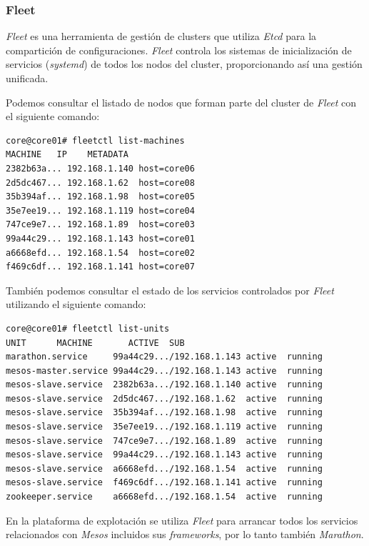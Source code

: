 \documentclass[a4paper,12pt,spanish,final]{epsc_tfc_pfc}
\begin{document}
\subsubsection{Fleet}

\emph{Fleet} es una herramienta de gestión de clusters que utiliza \emph{Etcd} para la compartición de configuraciones. \emph{Fleet} controla los sistemas de inicialización de servicios (\emph{systemd}) de todos los nodos del cluster, proporcionando así una gestión unificada.

Podemos consultar el listado de nodos que forman parte del cluster de \emph{Fleet} con el siguiente comando:\\

\begin{lstlisting}[style=dnsmasq]
core@core01# fleetctl list-machines
MACHINE   IP    METADATA
2382b63a... 192.168.1.140 host=core06
2d5dc467... 192.168.1.62  host=core08
35b394af... 192.168.1.98  host=core05
35e7ee19... 192.168.1.119 host=core04
747ce9e7... 192.168.1.89  host=core03
99a44c29... 192.168.1.143 host=core01
a6668efd... 192.168.1.54  host=core02
f469c6df... 192.168.1.141 host=core07
\end{lstlisting}

También podemos consultar el estado de los servicios controlados por \emph{Fleet} utilizando el siguiente comando:\\

\begin{lstlisting}[style=dnsmasq]
core@core01# fleetctl list-units
UNIT      MACHINE       ACTIVE  SUB
marathon.service     99a44c29.../192.168.1.143 active  running
mesos-master.service 99a44c29.../192.168.1.143 active  running
mesos-slave.service  2382b63a.../192.168.1.140 active  running
mesos-slave.service  2d5dc467.../192.168.1.62  active  running
mesos-slave.service  35b394af.../192.168.1.98  active  running
mesos-slave.service  35e7ee19.../192.168.1.119 active  running
mesos-slave.service  747ce9e7.../192.168.1.89  active  running
mesos-slave.service  99a44c29.../192.168.1.143 active  running
mesos-slave.service  a6668efd.../192.168.1.54  active  running
mesos-slave.service  f469c6df.../192.168.1.141 active  running
zookeeper.service    a6668efd.../192.168.1.54  active  running
\end{lstlisting}

En la plataforma de explotación se utiliza \emph{Fleet} para arrancar todos los servicios relacionados con \emph{Mesos} incluidos sus \emph{frameworks}, por lo tanto también \emph{Marathon}.
\end{document}
